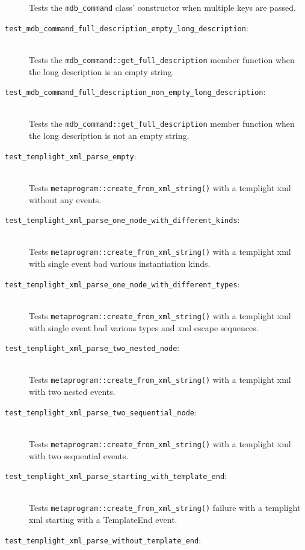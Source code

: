 \begin{description}
        Tests the \texttt{mdb\_command} class' constructor when multiple keys are
        passed.
    \item[\texttt{test\_mdb\_command\_full\_description\_empty\_long\_description}:] \hfill \\
        Tests the \texttt{mdb\_command::get\_full\_description} member function
        when the long description is an empty string.
    \item[\texttt{test\_mdb\_command\_full\_description\_non\_empty\_long\_description}:] \hfill \\
        Tests the \texttt{mdb\_command::get\_full\_description} member function
        when the long description is not an empty string.
    \item[\texttt{test\_templight\_xml\_parse\_empty}:] \hfill \\
        Tests \texttt{metaprogram::create\_from\_xml\_string()} with a templight
        xml without any events.
    \item[\texttt{test\_templight\_xml\_parse\_one\_node\_with\_different\_kinds}:] \hfill \\
        Tests \texttt{metaprogram::create\_from\_xml\_string()} with a templight
        xml with single event bad various instantiation kinds.
    \item[\texttt{test\_templight\_xml\_parse\_one\_node\_with\_different\_types}:] \hfill \\
        Tests \texttt{metaprogram::create\_from\_xml\_string()} with a templight
        xml with single event bad various types and xml escape sequences.
    \item[\texttt{test\_templight\_xml\_parse\_two\_nested\_node}:] \hfill \\
        Tests \texttt{metaprogram::create\_from\_xml\_string()} with a templight
        xml with two nested events.
    \item[\texttt{test\_templight\_xml\_parse\_two\_sequential\_node}:] \hfill \\
        Tests \texttt{metaprogram::create\_from\_xml\_string()} with a templight
        xml with two sequential events.
    \item[\texttt{test\_templight\_xml\_parse\_starting\_with\_template\_end}:] \hfill \\
        Tests \texttt{metaprogram::create\_from\_xml\_string()} failure with a
        templight xml starting with a TemplateEnd event.
    \item[\texttt{test\_templight\_xml\_parse\_without\_template\_end}:] \hfill \\

\end{description}

